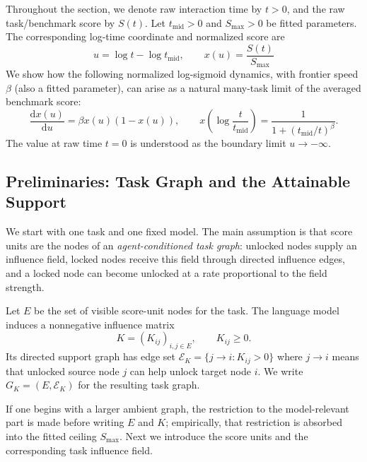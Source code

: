 Throughout the section, we denote raw interaction time by $t>0$, and the raw task/benchmark score by \(S(t)\). Let $t_{\mathrm{mid}} >0$ and \(S_{\max} > 0\) be fitted parameters. The corresponding log-time coordinate and normalized score are
\begin{equation*}
    u=\log t-\log t_{\mathrm{mid}},
    \qquad x(u) = \frac{S(t)}{S_{\max}}
\end{equation*}
We show how the following normalized log-sigmoid dynamics, with frontier speed $\beta$ (also a fitted parameter), can arise as a natural many-task limit of the averaged benchmark score:
\begin{equation*}
    \frac{\mathrm{d} x(u)}{\mathrm{d} u}= \beta x(u) (1 - x(u)),
    \qquad
    x\left(\log \frac{t}{t_{\mathrm{mid}}}\right)=\frac{1}{1+(t_{\mathrm{mid}}/t)^\beta}.
\end{equation*}
The value at raw time $t=0$ is understood as the boundary limit $u\to-\infty$.


\subsection{Preliminaries: Task Graph and the Attainable Support}
\label{subsec:theory-prelim}

We start with one task and one fixed model. The main assumption is that score units are the nodes of an \emph{agent-conditioned task graph}: unlocked nodes supply an influence field, locked nodes receive this field through directed influence edges, and a locked node can become unlocked at a rate proportional to the field strength.

\begin{definition}
\label{def:task-graph}
Let $E$ be the set of visible score-unit nodes for the task. The language model induces a nonnegative influence matrix
\begin{equation*}
    K=(K_{ij})_{i,j\in E},
    \qquad K_{ij}\ge 0.
\end{equation*}
Its directed support graph has edge set \(\mathcal E_K=\{j\to i:K_{ij}>0\}\) where $j\to i$ means that unlocked source node $j$ can help unlock target node $i$. We write \(G_K=(E,\mathcal E_K)\) for the resulting task graph.
\end{definition}

If one begins with a larger ambient graph, the restriction to the model-relevant part is made before writing $E$ and $K$; empirically, that restriction is absorbed into the fitted ceiling $S_{\max}$. Next we introduce the score units and the corresponding task influence field.

